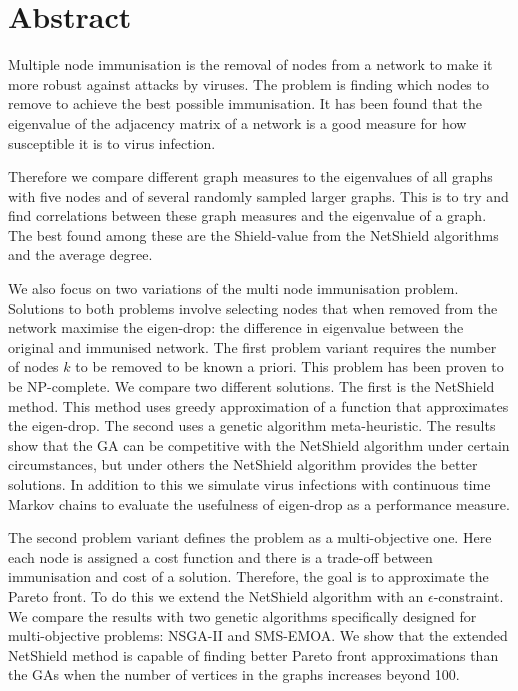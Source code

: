 \documentclass[11pt]{article}
\theoremstyle{definition}
\begin{document}




\setcounter{page}{1}
\tableofcontents

\cleardoublepage

\section*{Abstract}

Multiple node immunisation is the removal of nodes from a network to make it more robust against attacks by viruses. The problem is finding which nodes to remove to achieve the best possible immunisation. It has been found that the eigenvalue of the adjacency matrix of a network is a good measure for how susceptible it is to virus infection.

Therefore we compare different graph measures to the eigenvalues of all graphs with five nodes and of several randomly sampled larger graphs. This is to try and find correlations between these graph measures and the eigenvalue of a graph. The best found among these are the Shield-value from the NetShield algorithms and the average degree.

We also focus on two variations of the multi node immunisation problem. Solutions to both problems involve selecting nodes that when removed from the network maximise the eigen-drop: the difference in eigenvalue between the original and immunised network. The first problem variant requires the number of nodes $k$ to be removed to be known a priori. This problem has been proven to be NP-complete. We compare two different solutions. The first is the NetShield method. This method uses greedy approximation of a function that approximates the eigen-drop. The second uses a genetic algorithm meta-heuristic. The results show that the GA can be competitive with the NetShield algorithm under certain circumstances, but under others the NetShield algorithm provides the better solutions. In addition to this we simulate virus infections with continuous time Markov chains to evaluate the usefulness of eigen-drop as a performance measure.

The second problem variant defines the problem as a multi-objective one. Here each node is assigned a cost function and there is a trade-off between immunisation and cost of a solution. Therefore, the goal is to approximate the Pareto front. To do this we extend the NetShield algorithm with an $\epsilon$-constraint. We compare the results with two genetic algorithms specifically designed for multi-objective problems: NSGA-II and SMS-EMOA. We show that the extended NetShield method is capable of finding better Pareto front approximations than the GAs when the number of vertices in the graphs increases beyond 100. 
\end{document}
